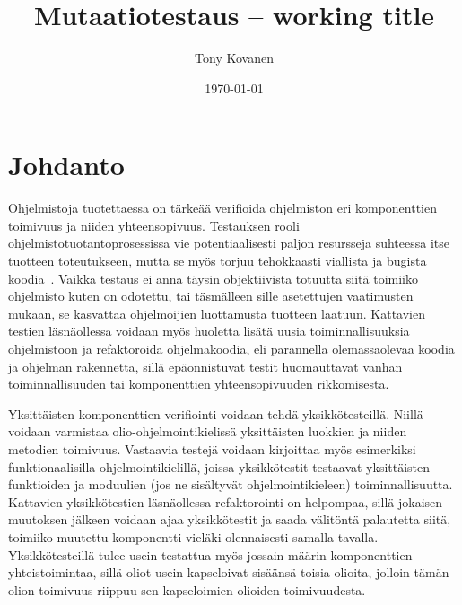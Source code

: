 \documentclass{tktltiki}
\begin{document}
\onehalfspacing

\title{Mutaatiotestaus -- working title}
\author{Tony Kovanen}
\date{\today}

\maketitle



\mytableofcontents

\section{Johdanto}
Ohjelmistoja tuotettaessa on tärkeää verifioida ohjelmiston eri komponenttien toimivuus ja niiden yhteensopivuus. Testauksen rooli ohjelmistotuotantoprosessissa vie potentiaalisesti paljon resursseja suhteessa itse tuotteen toteutukseen, mutta se myös torjuu tehokkaasti viallista ja bugista koodia~\cite{SchulerZ10}. Vaikka testaus ei anna täysin objektiivista totuutta siitä toimiiko ohjelmisto kuten on odotettu, tai täsmälleen sille asetettujen vaatimusten mukaan, se kasvattaa ohjelmoijien luottamusta tuotteen laatuun. Kattavien testien läsnäollessa voidaan myös huoletta lisätä uusia toiminnallisuuksia ohjelmistoon ja refaktoroida ohjelmakoodia, eli parannella olemassaolevaa koodia ja ohjelman rakennetta, sillä epäonnistuvat testit huomauttavat vanhan toiminnallisuuden tai komponenttien yhteensopivuuden rikkomisesta. 

Yksittäisten komponenttien verifiointi voidaan tehdä yksikkötesteillä. Niillä voidaan varmistaa olio-ohjelmointikielissä yksittäisten luokkien ja niiden metodien toimivuus. Vastaavia testejä voidaan kirjoittaa myös esimerkiksi funktionaalisilla ohjelmointikielillä, joissa yksikkötestit testaavat yksittäisten funktioiden ja moduulien (jos ne sisältyvät ohjelmointikieleen) toiminnallisuutta. Kattavien yksikkötestien läsnäollessa refaktorointi on helpompaa, sillä jokaisen muutoksen jälkeen voidaan ajaa yksikkötestit ja saada välitöntä palautetta siitä, toimiiko muutettu komponentti vieläki olennaisesti samalla tavalla. Yksikkötesteillä tulee usein testattua myös jossain määrin komponenttien yhteistoimintaa, sillä oliot usein kapseloivat sisäänsä toisia olioita, jolloin tämän olion toimivuus riippuu sen kapseloimien olioiden toimivuudesta. 
\end{document}
